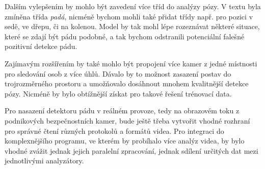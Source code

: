 Dalším vylepšením by mohlo být zavedení více tříd do analýzy pózy. V textu byla
zmíněna třída \textit{padá}, nicméně bychom mohli také přidat třídy např. pro
pozici v sedě, ve dřepu, či na kolenou. Model by tak mohl lépe rozeznávat
některé situace, které se zdají být pádu podobné, a tak bychom odstranili
potenciální falešné pozitivní detekce pádu.

Zajímavým rozšířením by také mohlo být propojení více kamer z jedné místnosti
pro sledování osob z více úhlů. Dávalo by to možnost zasazení postav do
trojrozměrného prostoru a umožňovalo dosáhnout mnohem kvalitnější detekce
pózy. Nicméně by bylo obtížnější získat pro takové řešení trénovací data.

Pro nasazení detektoru pádu v reálném provoze, tedy na obrazovém toku z
podnikových bezpečnostních kamer, bude ještě třeba vytvořit vhodné rozhraní pro
správné čtení různých protokolů a formátů videa. Pro integraci do komplexnějšího
programu, ve kterém by probíhalo více analýz videa, by bylo vhodné zvážit
jednak jejich paralelní zpracování, jednak sdílení určitých dat mezi
jednotlivými analyzátory.

\endinput